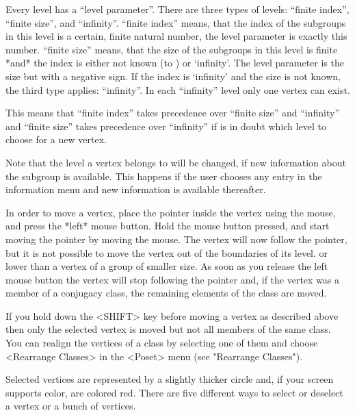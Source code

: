 Every level has a ``level parameter''.
There are three types of levels: ``finite index'', ``finite size'', and 
``infinity''. ``finite index'' means, that the index of the subgroups
in this level is a certain, finite natural number, the level parameter 
is exactly this number. ``finite size'' means, that the size of the
subgroups in this level is finite *and* the index is either not known
(to {\GAP}) or `infinity'. The level parameter is the size but with a
negative sign. If the index is `infinity' and the size is
not known, the third type applies: ``infinity''. In each ``infinity''
level only one vertex can exist.

This means that ``finite index'' takes precedence over ``finite size'' 
and ``infinity'' and ``finite size'' takes precedence over
``infinity'' if {\XGAP} is in doubt which level to choose for a new
vertex. 

Note that the level a vertex belongs to will be changed, if new
information about the subgroup is available. This happens if the user
chooses any entry in the information menu and new information is
available thereafter.



In order to move a vertex, place the  pointer inside the vertex using the
mouse, and press the *left* mouse button.  Hold the mouse button pressed,
and start moving  the pointer by moving  the mouse.  The  vertex will now
follow the pointer, but it is not possible to move the vertex out of
the boundaries of its level.
or lower than a vertex of a group of smaller
size.
As soon as you release the left mouse
button the vertex will stop following the pointer  and, if the vertex was
a member of a  conjugacy class, the remaining elements  of the class  are
moved.

If you hold  down  the <SHIFT> key before  moving  a vertex as  described
above then  only the selected vertex is moved but not all members of the
same class. You can realign the vertices of a class by selecting one of
them and choose <Rearrange Classes> in the <Poset> menu 
(see "Rearrange Classes").


Selected vertices are represented by a slightly thicker circle and, if
your screen supports color, are colored red.  There are five different
ways to select or deselect a vertex or a bunch of vertices.


